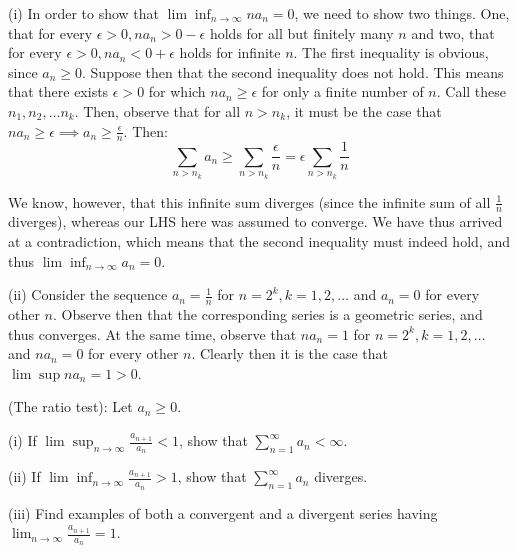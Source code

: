 \begin{solution}

    (i) In order to show that $\lim \inf_{n \rightarrow \infty} n a_n = 0$, we need to show two things. One, that for every $\epsilon > 0, n a_n > 0 - \epsilon$ holds for all but finitely many $n$ and two, that for every $\epsilon > 0, n a_n < 0 + \epsilon$ holds for infinite $n$. The first inequality is obvious, since $a_n \geq 0$. Suppose then that the second inequality does not hold. This means that there exists $\epsilon > 0$ for which $n a_n \geq \epsilon$ for only a finite number of $n$. Call these $n_1, n_2, \ldots n_k$. Then, observe that for all $n > n_k$, it must be the case that $n a_n \geq \epsilon \implies a_n \geq \frac{\epsilon}{n}$. Then:
    $$\sum_{n > n_k} a_n \geq \sum_{n > n_k} \frac{\epsilon}{n} = \epsilon \sum_{n > n_k} \frac{1}{n}$$

    We know, however, that this infinite sum diverges (since the infinite sum of all $\frac{1}{n}$ diverges), whereas our LHS here was assumed to converge. We have thus arrived at a contradiction, which means that the second inequality must indeed hold, and thus $\lim \inf_{n \rightarrow \infty} a_n = 0$.

    (ii) Consider the sequence $a_n = \frac{1}{n}$ for $n = 2^k, k = 1, 2, \ldots$ and $a_n = 0$ for every other $n$. Observe then that the corresponding series is a geometric series, and thus converges. At the same time, observe that $n a_n = 1$ for $n = 2^k, k =1, 2, \ldots$ and $n a_n = 0$ for every other $n$. Clearly then it is the case that $\lim \sup n a_n = 1 > 0$.
\end{solution}

\begin{exercise}{35}
    (The ratio test): Let $a_n \geq 0$.

    (i) If $\lim \sup_{n \rightarrow \infty} \frac{a_{n+1}}{a_n} < 1$, show that $\sum_{n=1}^{\infty} a_n < \infty$.

    (ii) If $\lim \inf_{n \rightarrow \infty} \frac{a_{n+1}}{a_n} > 1$, show that $\sum_{n=1}^{\infty} a_n$ diverges.

    (iii) Find examples of both a convergent and a divergent series having $\lim_{n \rightarrow \infty} \frac{a_{n+1}}{a_n} = 1$.
\end{exercise}


